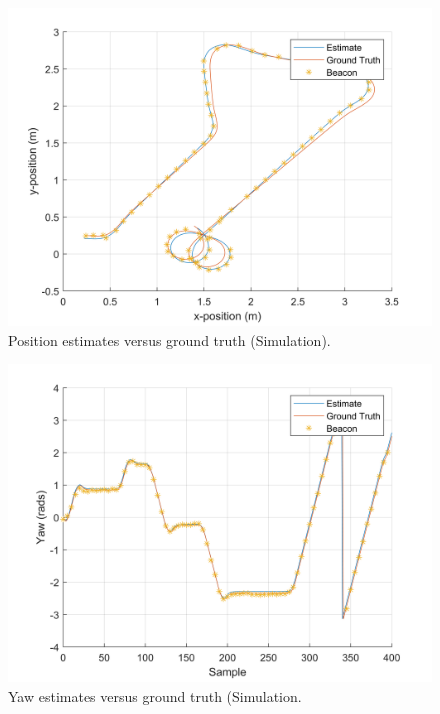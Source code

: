	\begin{figure}
	    	\captionsetup{width=\columnwidth}
	   	\centering
	   	\includegraphics[width=\columnwidth]{./graphics/posSimu.png}
	   	\caption{Position estimates versus ground truth (Simulation).}
		\label{fig:pos}
	\end{figure}
	
	\begin{figure}
	    	\captionsetup{width=\columnwidth}
	   	\centering
	   	\includegraphics[width=\columnwidth]{./graphics/yawSimu.png}
	   	\caption{Yaw estimates versus ground truth (Simulation.}
		\label{fig:yaw}
	\end{figure}
	

